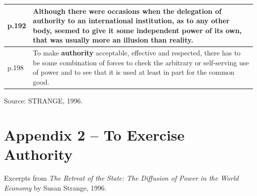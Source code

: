 \begin{longtable}{p{1.2cm} p{13cm}}
p.192 & Although there were occasions when the delegation of \textbf{authority} to an international institution, as to any other body, seemed to give it some independent power of its own, that was usually more an illusion than reality. \\
\midrule

p.198 & To make \textbf{authority} acceptable, effective and respected, there has to be some combination of forces to check the arbitrary or self-serving use of power and to see that it is used at least in part for the common good. \\
\bottomrule
\end{longtable}

\noindent Source: STRANGE, 1996.

\normalsize

\section*{Appendix 2 -- To Exercise Authority}

Excerpts from \emph{The Retreat of the State: The Diffusion of Power in the World Economy} by Susan Strange, 1996.

